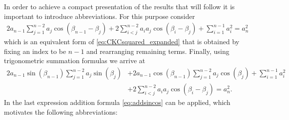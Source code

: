 \documentclass[10pt,a4paper]{article}
\theoremstyle{definition}
\theoremstyle{remark}
\numberwithin{equation}{section}
\begin{document}
In order to  achieve a compact presentation of the results that will follow it is important to introduce abbreviations. For this purpose consider   
\begin{align*}
2a_{n-1} \sum_{j=1}^{n-2} a_j \cos\left(\beta_{n-1} - \beta_j  \right) + 2 \sum_{i<j}^{n-2} a_i a_j  \cos(\beta_i -\beta_j) + \sum_{i=1}^{n-1} a_i^2 =  a_n^2     \end{align*}
which is an equivalent form of \eqref{eq:CKCsquared_expanded} that is obtained by fixing an index to be $n-1$ and rearranging remaining terms. Finally, using trigonometric summation formulas we arrive at    
\begin{align}\label{eq:squaredrearranged}
2 a_{n-1} \sin\left( \beta_{n-1} \right) \sum_{j=1}^{n-2} a_j \sin\left( \beta_j \right)  &+ 2a_{n-1} \cos\left( \beta_{n-1} \right) \sum_{j=1}^{n-2} a_j \cos\left( \beta_j \right) +  \sum_{i=1}^{n-1} a_i^2   \nonumber \\ 
&  +2\sum_{i<j}^{n-2} a_i a_j \cos\left( \beta_i - \beta_j \right) =  a_n^2.  
\end{align}
In the last expression addition formula \eqref{eq:addsincos} can be applied, which motivates the following abbreviations:\\
\end{document}
